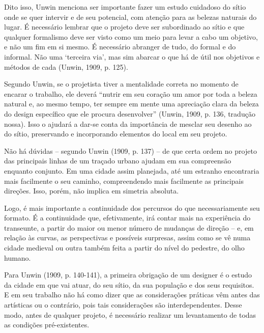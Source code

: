 \documentclass[12pt, a4paper]{book} %
\begin{document}
        Dito isso, Unwin menciona ser importante fazer um estudo cuidadoso do sítio onde se quer intervir e de seu potencial, com atenção para as belezas naturais do lugar. É necessário lembrar que o projeto deve ser subordinado ao sítio e que qualquer formalismo deve ser visto como um meio para levar a cabo um objetivo, e não um fim em si mesmo. É necessário abranger de tudo, do formal e do informal. Não uma `terceira via', mas sim abarcar o que há de útil nos objetivos e métodos de cada (Unwin, 1909, p. 125).

        Segundo Unwin, se o projetista tiver a mentalidade correta no momento de encarar o trabalho, ele deverá ``nutrir em seu coração um amor por toda a beleza natural e, ao mesmo tempo, ter sempre em mente uma apreciação clara da beleza do design específico que ele procura desenvolver'' (Unwin, 1909, p. 136, tradução nossa). Isso o ajudará a dar-se conta da importância de mesclar seu desenho ao do sítio, preservando e incorporando elementos do local em seu projeto.

        Não há dúvidas – segundo Unwin (1909, p. 137) – de que certa ordem no projeto das principais linhas de um traçado urbano ajudam em sua compreensão enquanto conjunto. Em uma cidade assim planejada, até um estranho encontraria mais facilmente o seu caminho, compreendendo mais facilmente as principais direções. Isso, porém, não implica em simetria absoluta.

        Logo, é mais importante a continuidade dos percursos do que necessariamente seu formato. É a continuidade que, efetivamente, irá contar mais na experiência do transeunte, a partir do maior ou menor número de mudanças de direção – e, em relação às curvas, as perspectivas e possíveis surpresas, assim como se vê numa cidade medieval ou outra também feita a partir do nível do pedestre, do olho humano.

        Para Unwin (1909, p. 140-141), a primeira obrigação de um designer é o estudo da cidade em que vai atuar, do seu sítio, da sua população e dos seus requisitos. E em seu trabalho não há como dizer que as considerações práticas vêm antes das artísticas ou o contrário, pois tais considerações são interdependentes. Desse modo, antes de qualquer projeto, é necessário realizar um levantamento de todas as condições pré-existentes.
\end{document}
